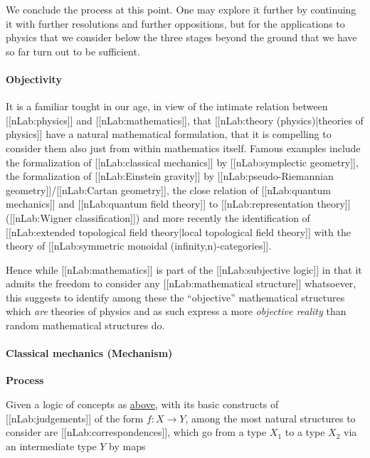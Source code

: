 \documentclass[12pt,titlepage]{article}
\theoremstyle{plain}
\theoremstyle{definition}
\theoremstyle{remark}
\begin{document}
$\,$

We conclude the process at this point. One may explore it further by continuing it with further resolutions and further oppositions, but for the applications to physics that we consider below the three stages beyond the ground that we have so far turn out to be sufficient.

\hypertarget{objectivity}{}\paragraph*{{Objectivity}}\label{objectivity}

It is a familiar tought in our age, in view of the intimate relation between [[nLab:physics]] and [[nLab:mathematics]], that [[nLab:theory (physics)|theories of physics]] have a natural mathematical formulation, that it is compelling to consider them also just from within mathematics itself. Famous examples include the formalization of [[nLab:classical mechanics]] by [[nLab:symplectic geometry]], the formalization of [[nLab:Einstein gravity]] by [[nLab:pseudo-Riemannian geometry]]/[[nLab:Cartan geometry]], the close relation of [[nLab:quantum mechanics]] and [[nLab:quantum field theory]] to [[nLab:representation theory]] ([[nLab:Wigner classification]]) and more recently the identification of [[nLab:extended topological field theory|local topological field theory]] with the theory of [[nLab:symmetric monoidal (infinity,n)-categories]].

Hence while [[nLab:mathematics]] is part of the [[nLab:subjective logic]] in that it admits the freedom to consider any [[nLab:mathematical structure]] whatsoever, this suggests to identify among these the ``objective'' mathematical structures which \emph{are} theories of physics and as such express a more \emph{objective reality} than random mathematical structures do.

\hypertarget{classical_mechanics_mechanism}{}\paragraph*{{Classical mechanics (Mechanism)}}\label{classical_mechanics_mechanism}

\textbf{Process}

Given a logic of concepts as \hyperlink{ConceptFormalization}{above}, with its basic constructs of [[nLab:judgements]] of the form $f \colon X \to Y$, among the most natural structures to consider are [[nLab:correspondences]], which go from a type $X_1$ to a type $X_2$ via an intermediate type $Y$ by maps
\end{document}
